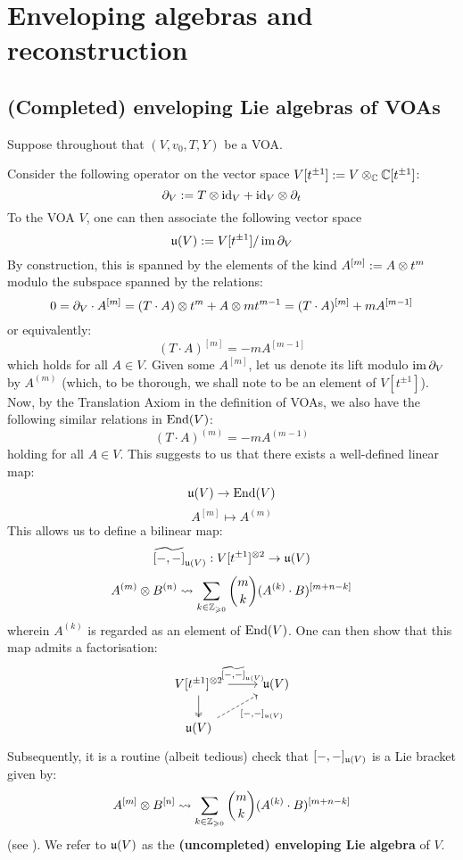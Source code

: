 \section{Enveloping algebras and reconstruction}
    \subsection{(Completed) enveloping Lie algebras of VOAs}
        Suppose throughout that $(V, v_0, T, Y)$ be a VOA.
    
        Consider the following operator on the vector space $V[t^{\pm 1}] := V \tensor_{\bbC} \bbC[t^{\pm 1}]$:
            $$\del_V := T \tensor \id_V + \id_V \tensor \del_t$$
        To the VOA $V$, one can then associate the following vector space
            $$\mathfrak{u}(V) := V[t^{\pm 1}]/\operatorname{im} \partial_V$$
        By construction, this is spanned by the elements of the kind $A^{[m]} := A \tensor t^m$ modulo the subspace spanned by the relations:
            $$0 = \del_V \cdot A^{[m]} = (T \cdot A) \tensor t^m + A \tensor m t^{m - 1} = (T \cdot A)^{[m]} + m A^{[m - 1]}$$
        or equivalently:
            $$(T \cdot A)^{[m]} = -m A^{[m - 1]}$$
        which holds for all $A \in V$. Given some $A^{[m]}$, let us denote its lift modulo $\operatorname{im} \partial_V$ by $A^{(m)}$ (which, to be thorough, we shall note to be an element of $V[t^{\pm 1}]$). Now, by the Translation Axiom in the definition of VOAs, we also have the following similar relations in $\mathrm{End}(V)$:
            $$(T \cdot A)^{(m)} = -m A^{(m - 1)}$$
        holding for all $A \in V$. This suggests to us that there exists a well-defined linear map:
            $$\mathfrak{u}(V) \to \mathrm{End}(V)$$
            $$A^{[m]} \mapsto A^{(m)}$$
        This allows us to define a bilinear map:
            $$\widetilde{[-, -]}_{\fraku(V)}: V[t^{\pm 1}]^{\tensor 2} \to \fraku(V)$$
            $$A^{(m)} \tensor B^{(n)} \mapsto \sum_{k \in \Z_{\geq 0}} \binom{m}{k} (A^{(k)} \cdot B)^{[m + n - k]}$$
        wherein $A^{(k)}$ is regarded as an element of $\mathrm{End}(V)$. One can then show that this map admits a factorisation:
            $$
                \begin{tikzcd}
                {V[t^{\pm 1}]^{\tensor 2}} & {\fraku(V)} \\
                {\fraku(V)}
                \arrow["{\widetilde{[-, -]}_{\fraku(V)}}", from=1-1, to=1-2]
                \arrow[two heads, from=1-1, to=2-1]
                \arrow["{[-, -]_{\fraku(V)}}"', dashed, from=2-1, to=1-2]
                \end{tikzcd}
            $$
        Subsequently, it is a routine (albeit tedious) check that $[-, -]_{\mathfrak{u}(V)}$ is a Lie bracket given by:
            $$A^{[m]} \tensor B^{[n]} \mapsto \sum_{k \in \Z_{\geq 0}} \binom{m}{k} (A^{(k)} \cdot B)^{[m + n - k]}$$
        (see \cite[Theorem 4.1.2]{frenkel_ben_zvi_vertex_algebras_and_algebraic_curves}). We refer to $\mathfrak{u}(V)$ as the \textbf{(uncompleted) enveloping Lie algebra} of $V$.

